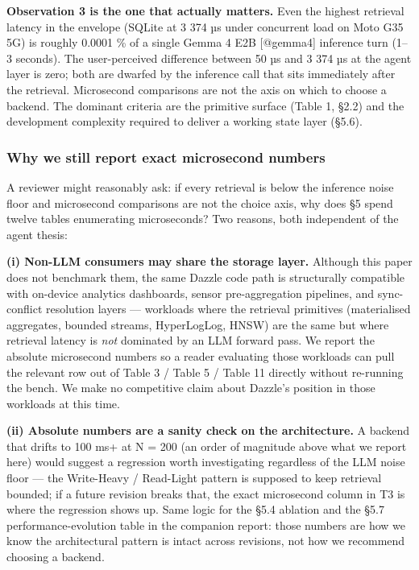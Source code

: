 \textbf{Observation 3 is the one that actually matters.} Even the highest
retrieval latency in the envelope (SQLite at 3 374 µs under concurrent load on
Moto G35 5G) is roughly 0.0001 \% of a single Gemma 4 E2B {[}@gemma4{]}
inference turn (1--3 seconds). The user-perceived difference between 50 µs and 3
374 µs at the agent layer is zero; both are dwarfed by the inference call that
sits immediately after the retrieval. Microsecond comparisons are not the axis
on which to choose a backend. The dominant criteria are the primitive surface
(Table 1, §2.2) and the development complexity required to deliver a working
state layer (§5.6).

\subsubsection{Why we still report exact microsecond
numbers}\label{why-we-still-report-exact-microsecond-numbers}

A reviewer might reasonably ask: if every retrieval is below the inference noise
floor and microsecond comparisons are not the choice axis, why does §5 spend
twelve tables enumerating microseconds? Two reasons, both independent of the
agent thesis:

\textbf{(i) Non-LLM consumers may share the storage layer.} Although this paper
does not benchmark them, the same Dazzle code path is structurally compatible
with on-device analytics dashboards, sensor pre-aggregation pipelines, and
sync-conflict resolution layers --- workloads where the retrieval primitives
(materialised aggregates, bounded streams, HyperLogLog, HNSW) are the same but
where retrieval latency is \emph{not} dominated by an LLM forward pass. We
report the absolute microsecond numbers so a reader evaluating those workloads
can pull the relevant row out of Table 3 / Table 5 / Table 11 directly without
re-running the bench. We make no competitive claim about Dazzle's position in
those workloads at this time.

\textbf{(ii) Absolute numbers are a sanity check on the architecture.} A backend
that drifts to 100 ms+ at N = 200 (an order of magnitude above what we report
here) would suggest a regression worth investigating regardless of the LLM noise
floor --- the Write-Heavy / Read-Light pattern is supposed to keep retrieval
bounded; if a future revision breaks that, the exact microsecond column in T3 is
where the regression shows up. Same logic for the §5.4 ablation and the §5.7
performance-evolution table in the companion report: those numbers are how we
know the architectural pattern is intact across revisions, not how we recommend
choosing a backend.

